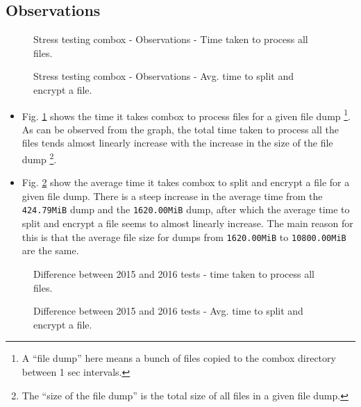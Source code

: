 \subsection{Observations}\label{4-st-o}

\begin{figure}[h]
  \centering 
  \caption{Stress testing combox - Observations - Time taken to
    process all files.}
  \label{fig:4-st-tt}
\end{figure}

\begin{figure}[h]
  \centering 
  \caption{Stress testing combox - Observations - Avg. time to split
    and encrypt a file.}
  \label{fig:4-st-atsae}
\end{figure}


\begin{itemize}
\item Fig. \ref{fig:4-st-tt} shows the time it takes combox to process
  files for a given file dump \footnote{A ``file dump'' here means a
    bunch of files copied to the combox directory between 1 sec
    intervals.}. As can be observed from the graph, the total time
  taken to process all the files tends almost linearly increase with
  the increase in the size of the file dump \footnote{The ``size of
    the file dump'' is the total size of all files in a given file
    dump.}.
\item Fig. \ref{fig:4-st-atsae} show the average time it takes combox
  to split and encrypt a file for a given file dump. There is a steep
  increase in the average time from the \verb+424.79MiB+ dump and the
  \verb+1620.00MiB+ dump, after which the average time to split and
  encrypt a file seems to almost linearly increase. The main reason
  for this is that the average file size for dumps from
  \verb+1620.00MiB+ to \verb+10800.00MiB+ are the same.
\end{itemize}

\begin{figure}[h]
  \centering 
  \caption{Difference between 2015 and 2016 tests - time taken to
    process all files.}
  \label{fig:4-st-tt-diff}
\end{figure}

\begin{figure}[h]
  \centering 
  \caption{Difference between 2015 and 2016 tests - Avg. time to split
    and encrypt a file.}
  \label{fig:4-st-atsae-diff}
\end{figure}

